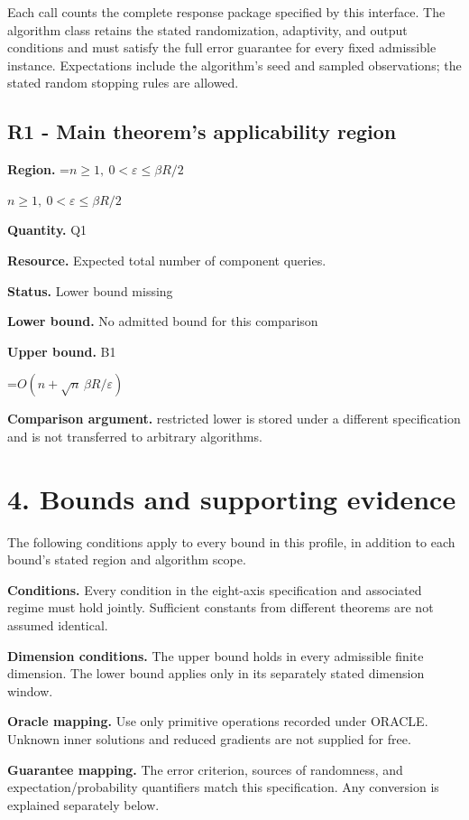 \documentclass[10pt,a4paper]{article}
\newcommand{\AtlasMath}[1]{\par\begingroup\centering\setbox0=\hbox{$\displaystyle #1$}\ifdim\wd0>1.4\linewidth\typeout{ATLAS WIDE FORMULA: \the\wd0}\fi\ifdim\wd0>\linewidth\resizebox{\linewidth}{!}{\box0}\else\box0\fi\par\endgroup}
\newcommand{\AtlasInlineMath}[1]{\begingroup\setbox0=\hbox{$#1$}\ifdim\wd0>.4\linewidth\endgroup\AtlasMath{#1}\else\endgroup$#1$\fi}
\begin{document}
Each call counts the complete response package specified by this interface. The algorithm class retains the stated randomization, adaptivity, and output conditions and must satisfy the full error guarantee for every fixed admissible instance. Expectations include the algorithm's seed and sampled observations; the stated random stopping rules are allowed.

\subsection{R1 - Main theorem's applicability region}
\textbf{Region.} \AtlasInlineMath{n\ge1,\ 0<\varepsilon\le\beta R/2}

\textbf{Quantity.} Q1

\textbf{Resource.} Expected total number of component queries.

\textbf{Status.} Lower bound missing

\textbf{Lower bound.} No admitted bound for this comparison

\textbf{Upper bound.} B1

\AtlasMath{O(n+\sqrt n\,\beta R/\varepsilon)}
\textbf{Comparison argument.} restricted lower is stored under a different specification and is not transferred to arbitrary algorithms.

\section{4. Bounds and supporting evidence}
The following conditions apply to every bound in this profile, in addition to each bound's stated region and algorithm scope.

\textbf{Conditions.} Every condition in the eight-axis specification and associated regime must hold jointly. Sufficient constants from different theorems are not assumed identical.

\textbf{Dimension conditions.} The upper bound holds in every admissible finite dimension. The lower bound applies only in its separately stated dimension window.

\textbf{Oracle mapping.} Use only primitive operations recorded under ORACLE. Unknown inner solutions and reduced gradients are not supplied for free.

\textbf{Guarantee mapping.} The error criterion, sources of randomness, and expectation/probability quantifiers match this specification. Any conversion is explained separately below.
\end{document}

